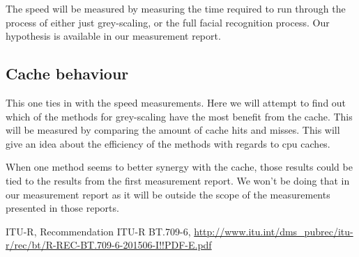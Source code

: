 \documentclass[a4paper]{article}
\begin{document}
The speed will be measured by measuring the time required to run through the process of either just grey-scaling, or the full facial recognition process. Our hypothesis is available in our measurement report.

\subsection{Cache behaviour}
This one ties in with the speed measurements. Here we will attempt to find out which of the methods for grey-scaling have the most benefit from the cache. This will be measured by comparing the amount of cache hits and misses. This will give an idea about the efficiency of the methods with regards to cpu caches.

When one method seems to better synergy with the cache, those results could be tied to the results from the first measurement report. We won't be doing that in our measurement report as it will be outside the scope of the measurements presented in those reports.

\begin{thebibliography}{9}

	ITU-R,
	Recommendation  ITU-R  BT.709-6,	
	\url{http://www.itu.int/dms_pubrec/itu-r/rec/bt/R-REC-BT.709-6-201506-I!!PDF-E.pdf}

\end{thebibliography}
\end{document}
